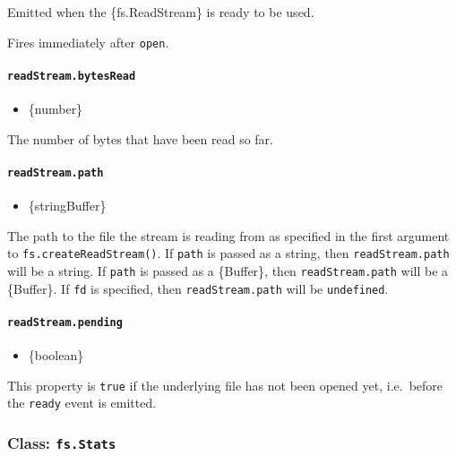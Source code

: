 Emitted when the \{fs.ReadStream\} is ready to be used.

Fires immediately after
\texttt{\textquotesingle{}open\textquotesingle{}}.

\paragraph{\texorpdfstring{\texttt{readStream.bytesRead}}{readStream.bytesRead}}\label{readstream.bytesread}

\begin{itemize}
\tightlist
\item
  \{number\}
\end{itemize}

The number of bytes that have been read so far.

\paragraph{\texorpdfstring{\texttt{readStream.path}}{readStream.path}}\label{readstream.path}

\begin{itemize}
\tightlist
\item
  \{string\textbar Buffer\}
\end{itemize}

The path to the file the stream is reading from as specified in the
first argument to \texttt{fs.createReadStream()}. If \texttt{path} is
passed as a string, then \texttt{readStream.path} will be a string. If
\texttt{path} is passed as a \{Buffer\}, then \texttt{readStream.path}
will be a \{Buffer\}. If \texttt{fd} is specified, then
\texttt{readStream.path} will be \texttt{undefined}.

\paragraph{\texorpdfstring{\texttt{readStream.pending}}{readStream.pending}}\label{readstream.pending}

\begin{itemize}
\tightlist
\item
  \{boolean\}
\end{itemize}

This property is \texttt{true} if the underlying file has not been
opened yet, i.e.~before the
\texttt{\textquotesingle{}ready\textquotesingle{}} event is emitted.

\subsubsection{\texorpdfstring{Class:
\texttt{fs.Stats}}{Class: fs.Stats}}\label{class-fs.stats}

